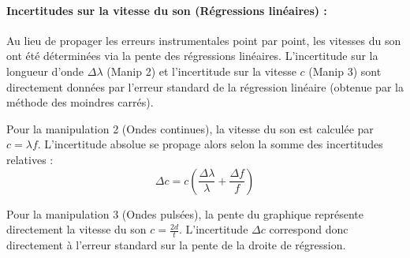 \documentclass[a4paper, 12pt,oneside]{article}
\begin{document}
\paragraph{Incertitudes sur la vitesse du son (Régressions linéaires) : }
Au lieu de propager les erreurs instrumentales point par point, les vitesses du son ont été déterminées via la pente des régressions linéaires. L'incertitude sur la longueur d'onde $\Delta \lambda$ (Manip 2) et l'incertitude sur la vitesse $c$ (Manip 3) sont directement données par l'erreur standard de la régression linéaire (obtenue par la méthode des moindres carrés).

Pour la manipulation 2 (Ondes continues), la vitesse du son est calculée par $c = \lambda f$. L'incertitude absolue se propage alors selon la somme des incertitudes relatives :
\begin{equation}
    \Delta c = c \left( \frac{\Delta \lambda}{\lambda} + \frac{\Delta f}{f} \right)
\end{equation}

Pour la manipulation 3 (Ondes pulsées), la pente du graphique représente directement la vitesse du son $c = \frac{2d}{t}$. L'incertitude $\Delta c$ correspond donc directement à l'erreur standard sur la pente de la droite de régression.
\end{document}
